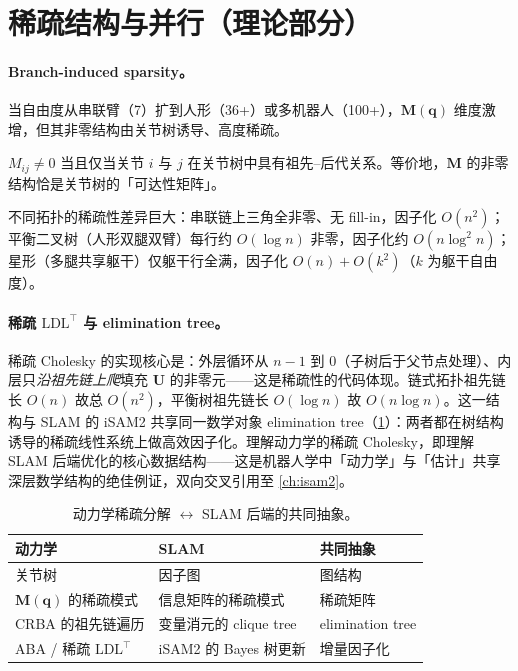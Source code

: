 \section{稀疏结构与并行（理论部分）}
\label{sec:on-sparse}

\paragraph{Branch-induced sparsity。}
当自由度从串联臂（7）扩到人形（36+）或多机器人（100+），$\mathbf M(\mathbf q)$ 维度激增，但其非零结构由关节树诱导、高度稀疏。

\begin{theorem}[分支诱导稀疏性]\label{thm:on-sparsity}
$M_{ij}\neq0$ 当且仅当关节 $i$ 与 $j$ 在关节树中具有祖先--后代关系\cite{featherstone2005empirical}。等价地，$\mathbf M$ 的非零结构恰是关节树的「可达性矩阵」。
\end{theorem}

不同拓扑的稀疏性差异巨大：串联链上三角全非零、无 fill-in，因子化 $O(n^2)$；平衡二叉树（人形双腿双臂）每行约 $O(\log n)$ 非零，因子化约 $O(n\log^2 n)$；星形（多腿共享躯干）仅躯干行全满，因子化 $O(n)+O(k^2)$（$k$ 为躯干自由度）。

\paragraph{稀疏 $\mathrm{LDL}^\top$ 与 elimination tree。}
稀疏 Cholesky 的实现核心是：外层循环从 $n-1$ 到 $0$（子树后于父节点处理）、内层只\emph{沿祖先链上爬}填充 $\mathbf U$ 的非零元——这是稀疏性的代码体现。链式拓扑祖先链长 $O(n)$ 故总 $O(n^2)$，平衡树祖先链长 $O(\log n)$ 故 $O(n\log n)$。这一结构与 SLAM 的 iSAM2 共享同一数学对象 elimination tree（\cref{tab:on-elim}）：两者都在树结构诱导的稀疏线性系统上做高效因子化。理解动力学的稀疏 Cholesky，即理解 SLAM 后端优化的核心数据结构——这是机器人学中「动力学」与「估计」共享深层数学结构的绝佳例证，双向交叉引用至 \cref{ch:isam2}。

\begin{table}[H]\centering\small
\caption{动力学稀疏分解 $\leftrightarrow$ SLAM 后端的共同抽象。}
\label{tab:on-elim}
\begin{tabular}{lll}
\toprule
动力学 & SLAM & 共同抽象 \\
\midrule
关节树 & 因子图 & 图结构 \\
$\mathbf M(\mathbf q)$ 的稀疏模式 & 信息矩阵的稀疏模式 & 稀疏矩阵 \\
CRBA 的祖先链遍历 & 变量消元的 clique tree & elimination tree \\
ABA / 稀疏 $\mathrm{LDL}^\top$ & iSAM2 的 Bayes 树更新 & 增量因子化 \\
\bottomrule
\end{tabular}
\end{table}

